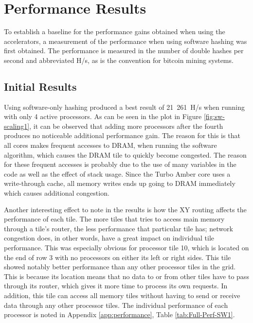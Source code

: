 \section{Performance Results}

To establish a baseline for the performance gains obtained when using the accelerators,
a measurement of the performance when using software hashing was first obtained. The
performance is measured in the number of double hashes per second and abbreviated H/s,
as is the convention for bitcoin mining systems.

\subsection{Initial Results}
\label{sec:init-results}

Using software-only hashing produced a best result of 21~261~H/s when running with only 4 active processors. As can be seen
in the plot in Figure \ref{fig:sw-scaling1}, it can be observed that adding more processors after the fourth produces no
noticeable additional performance gain. The reason for this is that all cores makes frequent
accesses to DRAM, when running the software algorithm, which causes the DRAM tile to quickly
become congested. The reason for these frequent accesses is probably due to the use of
many variables in the code as well as the effect of stack usage. Since the Turbo Amber core
uses a write-through cache, all memory writes ends up going to DRAM immediately which causes
additional congestion.

Another interesting effect to note in the results is how the XY routing affects the performance
of each tile. The more tiles that tries to access main memory through a tile's router, the less
performance that particular tile has; network congestion does, in other words, have a great impact on individual
tile performance.
This was especially obvious for processor tile 10, which is located on the end of row 3 with no
processors on either its left or right sides. This tile showed notably better performance than
any other processor tiles in the grid. This is because its location means that no data to or from other tiles
have to pass through its router, which gives it more time to process its own requests. In addition,
this tile can access all memory tiles without having to send or receive data through any other
processor tiles. The individual performance of each processor is noted in
Appendix \ref{app:performance}, Table \ref{tab:Full-Perf-SW1}.


